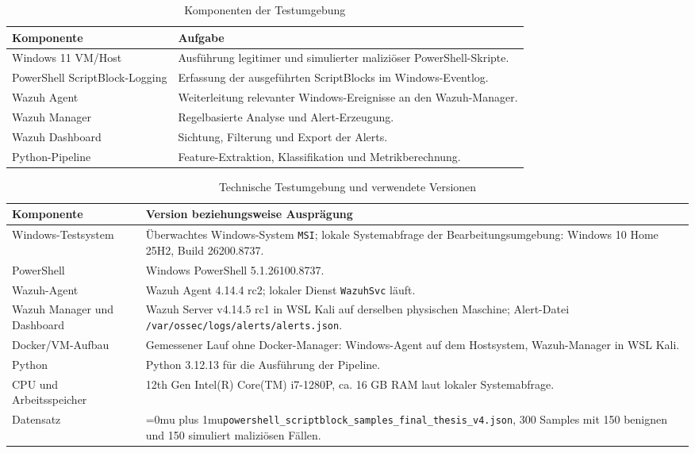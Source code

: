 \documentclass[12pt,a4paper,oneside,parskip=half]{scrreprt}
\newcommand{\codecell}[1]{\begingroup\Urlmuskip=0mu plus 1mu\relax\nolinkurl{#1}\endgroup}
\newcommand{\codebreakthree}[3]{\codecell{#1#2#3}}
\begin{document}
\begin{table}[H]
\centering
\caption{Komponenten der Testumgebung}
\begin{tabularx}{\textwidth}{|L{4cm}|Y|}
\hline
\textbf{Komponente} & \textbf{Aufgabe}\\
\hline
Windows 11 VM/Host & Ausführung legitimer und simulierter maliziöser PowerShell-Skripte.\\
\hline
PowerShell ScriptBlock-Logging & Erfassung der ausgeführten ScriptBlocks im Windows-Eventlog.\\
\hline
Wazuh Agent & Weiterleitung relevanter Windows-Ereignisse an den Wazuh-Manager.\\
\hline
Wazuh Manager & Regelbasierte Analyse und Alert-Erzeugung.\\
\hline
Wazuh Dashboard & Sichtung, Filterung und Export der Alerts.\\
\hline
Python-Pipeline & Feature-Extraktion, Klassifikation und Metrikberechnung.\\
\hline
\end{tabularx}
\end{table}

\begin{table}[H]
\centering
\caption{Technische Testumgebung und verwendete Versionen}
\small
\begin{tabularx}{\textwidth}{|L{4cm}|Y|}
\hline
\textbf{Komponente} & \textbf{Version beziehungsweise Ausprägung}\\
\hline
Windows-Testsystem & Überwachtes Windows-System \texttt{MSI}; lokale Systemabfrage der Bearbeitungsumgebung: Windows 10 Home 25H2, Build 26200.8737.\\
\hline
PowerShell & Windows PowerShell 5.1.26100.8737.\\
\hline
Wazuh-Agent & Wazuh Agent 4.14.4 rc2; lokaler Dienst \texttt{WazuhSvc} läuft.\\
\hline
Wazuh Manager und Dashboard & Wazuh Server v4.14.5 rc1 in WSL Kali auf derselben physischen Maschine; Alert-Datei \texttt{/var/ossec/logs/alerts/alerts.json}.\\
\hline
Docker/VM-Aufbau & Gemessener Lauf ohne Docker-Manager: Windows-Agent auf dem Hostsystem, Wazuh-Manager in WSL Kali.\\
\hline
Python & Python 3.12.13 für die Ausführung der Pipeline.\\
\hline
CPU und Arbeitsspeicher & 12th Gen Intel(R) Core(TM) i7-1280P, ca. 16 GB RAM laut lokaler Systemabfrage.\\
\hline
Datensatz & \codebreakthree{powershell\_scriptblock}{\_samples\_final}{\_thesis\_v4.json}, 300 Samples mit 150 benignen und 150 simuliert maliziösen Fällen.\\
\hline
\end{tabularx}
\end{table}
\end{document}
